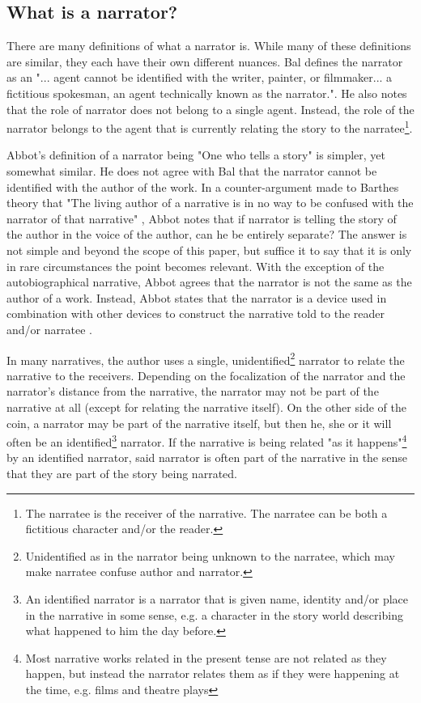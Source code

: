 \subsection{What is a narrator?}
There are many definitions of what a narrator is. While many of these definitions are similar, they each have their own different nuances. Bal defines the narrator as an "... agent cannot be identified with the writer, painter, or filmmaker... a fictitious spokesman, an agent technically known as the narrator."\cite[p. 8]{Bal}. He also notes that the role of narrator does not belong to a single agent. Instead, the role of the narrator belongs to the agent that is currently relating the story to the narratee\footnote{The narratee is the receiver of the narrative. The narratee can be both a fictitious character and/or the reader.}. 

Abbot's definition of a narrator being "One who tells a story"\cite[p. 238]{Abbot} is simpler, yet somewhat similar. He does not agree with Bal that the narrator cannot be identified with the author of the work. In a counter-argument made to Barthes theory that "The living author of a narrative is in no way to be confused with the narrator of that narrative" \cite[p. 261]{Barthes}, Abbot notes that if narrator is telling the story of the author in the voice of the author, can he be entirely separate? The answer is not simple and beyond the scope of this paper, but suffice it to say that it is only in rare circumstances the point becomes relevant. With the exception of the autobiographical narrative, Abbot agrees that the narrator is not the same as the author of a work. Instead, Abbot states that the narrator is a device used in combination with other devices to construct the narrative told to the reader and/or narratee \cite[p. 69]{Abbot}.

In many narratives, the author uses a single, unidentified\footnote{Unidentified as in the narrator being unknown to the narratee, which may make narratee confuse author and narrator.} narrator to relate the narrative to the receivers. Depending on the focalization of the narrator and the narrator's distance from the narrative, the narrator may not be part of the narrative at all (except for relating the narrative itself). On the other side of the coin, a narrator may be part of the narrative itself, but then he, she or it will often be an identified\footnote{An identified narrator is a narrator that is given name, identity and/or place in the narrative in some sense, e.g. a character in the story world describing what happened to him the day before.} narrator. If the narrative is being related "as it happens"\footnote{Most narrative works related in the present tense are not related as they happen, but instead the narrator relates them as if they were happening at the time, e.g. films and theatre plays} by an identified narrator, said narrator is often part of the narrative in the sense that they are part of the story being narrated.